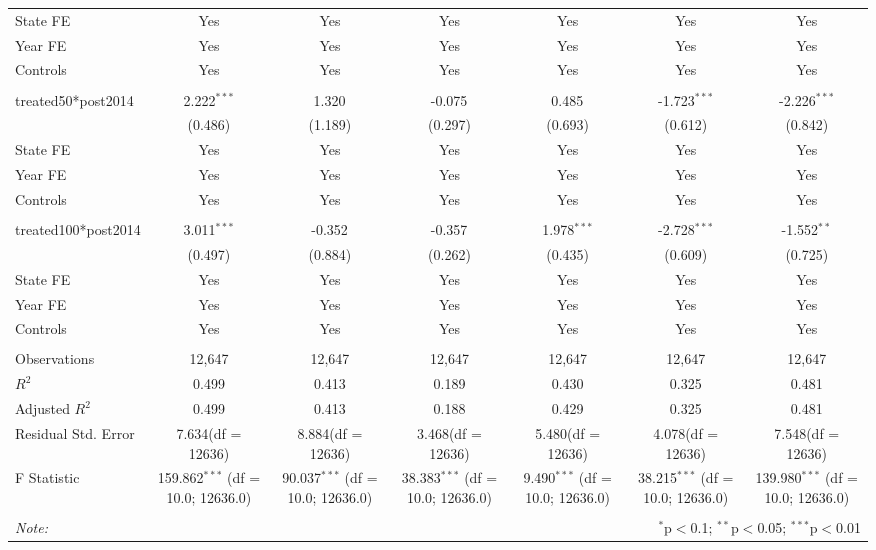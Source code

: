 \documentclass[12pt]{article}
\begin{document}
\begin{table}[!htbp]
\begin{tabular}{@{\extracolsep{5pt}}lcccccc}
 State FE & Yes & Yes & Yes & Yes & Yes & Yes \\
 Year FE & Yes & Yes & Yes & Yes & Yes & Yes \\
 Controls & Yes & Yes & Yes & Yes & Yes & Yes \\
\hline \\[-1.8ex]
 treated50*post2014 & 2.222$^{***}$ & 1.320$^{}$ & -0.075$^{}$ & 0.485$^{}$ & -1.723$^{***}$ & -2.226$^{***}$ \\
  & (0.486) & (1.189) & (0.297) & (0.693) & (0.612) & (0.842) \\
 State FE & Yes & Yes & Yes & Yes & Yes & Yes \\
 Year FE & Yes & Yes & Yes & Yes & Yes & Yes \\
 Controls & Yes & Yes & Yes & Yes & Yes & Yes \\
\hline \\[-1.8ex]
 treated100*post2014 & 3.011$^{***}$ & -0.352$^{}$ & -0.357$^{}$ & 1.978$^{***}$ & -2.728$^{***}$ & -1.552$^{**}$ \\
  & (0.497) & (0.884) & (0.262) & (0.435) & (0.609) & (0.725) \\
 State FE & Yes & Yes & Yes & Yes & Yes & Yes \\
 Year FE & Yes & Yes & Yes & Yes & Yes & Yes \\
 Controls & Yes & Yes & Yes & Yes & Yes & Yes \\
\hline \\[-1.8ex]
 Observations & 12,647 & 12,647 & 12,647 & 12,647 & 12,647 & 12,647 \\
 $R^2$ & 0.499 & 0.413 & 0.189 & 0.430 & 0.325 & 0.481 \\
 Adjusted $R^2$ & 0.499 & 0.413 & 0.188 & 0.429 & 0.325 & 0.481 \\
 Residual Std. Error & 7.634(df = 12636) & 8.884(df = 12636) & 3.468(df = 12636) & 5.480(df = 12636) & 4.078(df = 12636) & 7.548(df = 12636)  \\
 F Statistic & 159.862$^{***}$ (df = 10.0; 12636.0) & 90.037$^{***}$ (df = 10.0; 12636.0) & 38.383$^{***}$ (df = 10.0; 12636.0) & 9.490$^{***}$ (df = 10.0; 12636.0) & 38.215$^{***}$ (df = 10.0; 12636.0) & 139.980$^{***}$ (df = 10.0; 12636.0) \\
\hline
\hline \\[-1.8ex]
\textit{Note:} & \multicolumn{6}{r}{$^{*}$p$<$0.1; $^{**}$p$<$0.05; $^{***}$p$<$0.01} \\
\end{tabular}
\end{table}
\end{document}
